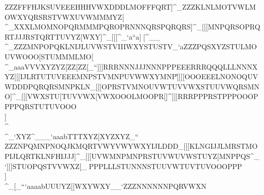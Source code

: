                                 ZZZFFFHJKSUVEEEHHHVWXDDDLMOFFFQRT]^_                                                            ZZZKLNLMOTVWLMOWXYQRSRSTVWXUVWMMMYZ[                                                            \\\TUVYZ[[\]PQRVWX[\]STURSTSTUYZ[]^_                                                            XXXLMOMNOPQRMMMPQROPRNNNQRSPQRQRS]^_                                                            [[[MNPQRSOPRQRTJJJRSTQRTTUVYZ[WXY]^_                                                            [[[\]^_`a``a]^^Z[\SSSXYZXYZXYZXYZ^__                                                            \\^_                                                            ZZZMNPOPQKLNIJLUVWSTVIIIWXYSTUSTV_`a                                                            ZZZPQSXYZSTULMOUVWOOO[\]STUMMMLMO[\]                                                            \\\WXYWWYWXYVWXZ[\YZ[YZ[STUWXX\]^_`a                                                            [[[STUQRSKKKLMOPQRLLLJJJMNPWXYQRS[\]                                                            [[[NOPNNNOOOLLLSTUSTURSTVWXXYZNNN_`a                                                            [[[^_`[\]XYZ]^_aaaVVVXYZYZ[ZZ[ZZ[_``                                                            ]]]RRRNNNJJJNNNPPPEEERRRQQQLLLNNNXYZ                                                            [[[IJLRTUTUVEEEMNPSTVMNPUVWWXYMNP[\^                                                            [[[OOOEEELNONOQUVWDDDPQRQRSMNPKLN\]_                                                            [[[OPRSTVMNOUVWTUVVWXSTUUVWQRSMNO]^_                                                            [[[VWXSTU[\]TUVVWX[\]VWXOOOLMOOPR[]^                                                            ]]]RRRPPPRSTPPPOOOPPPPQRSTUTUVOOO\\]                                                            \\\QRSJJJNOPRSTSTUOPQQRSRSTIIIOPR\]^                                                            \\\^_`XYZ^___`aaabTTTXYZ[\]XYZXYZ_``                                                            \\\OOOHHHHHHSSSLLLKKKPPPPPPOOOJJJXYZ                                                            ZZZNPQMNPNOQJKMQRTVWYVWYWXYIJLDDD\]_                                                            [[[KLNGIJJLMRSTMOPIJLQRTKLNFHIJJJ]^_                                                            [[[UVWMNPMNPRSTUVWUVWSTUYZ[MNPPQS^_`                                                            ]]]STUOPQSTVVWXZ[\XYZOPRHHHHHHVWX\]_                                                            ^^^PPPLLLSTUNNNSTUUVWTUVTUVOOOPPP\\]                                                            \\\OPRSTUSTVWXYIIIMNPNOPMNORSTRST[\^                                                            [[[]^_[\]_```aaaabUUUYZ[[\]WXYWXY__`                                                            ZZZNNNNNNPQRVWXN